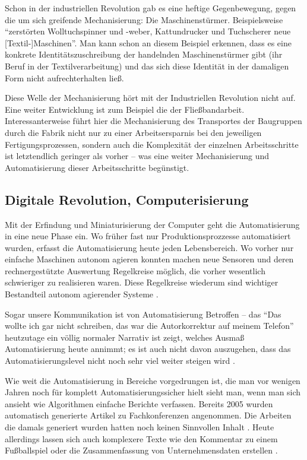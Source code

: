 Schon in der industriellen Revolution gab es eine heftige Gegenbewegung, gegen die um sich greifende Mechanisierung: Die Maschinenstürmer.
Beispielsweise \enquote{zerstörten Wolltuchspinner und -weber, Kattundrucker und Tuchscherer neue [Textil-]Maschinen}\parencite[44]{spehr}.
Man kann schon an diesem Beispiel erkennen, dass es eine konkrete Identitätszuschreibung der handelnden Maschinenstürmer gibt (ihr Beruf in der Textilverarbeitung) und das sich diese Identität in der damaligen Form nicht aufrechterhalten ließ.


Diese Welle der Mechanisierung hört mit der Industriellen Revolution nicht auf.
Eine weiter Entwicklung ist zum Beispiel die der Fließbandarbeit.
Interessanterweise führt hier die Mechanisierung des Transportes der Baugruppen durch die Fabrik nicht nur zu einer Arbeitsersparnis bei den jeweiligen Fertigungsprozessen, sondern auch die Komplexität der einzelnen Arbeitsschritte ist letztendlich geringer als vorher – was eine weiter Mechanisierung und Automatisierung dieser Arbeitsschritte begünstigt.

\subsection {Digitale Revolution, Computerisierung}
Mit der Erfindung und Miniaturisierung der Computer geht die Automatisierung in eine neue Phase ein. Wo früher fast nur Produktionsprozzesse automatisiert wurden, erfasst die Automatisierung heute jeden Lebensbereich.
Wo vorher nur einfache Maschinen autonom agieren konnten machen neue Sensoren und deren rechnergestützte Auswertung Regelkreise möglich, die vorher wesentlich schwieriger zu realisieren waren.
Diese Regelkreise wiederum sind wichtiger Bestandteil autonom agierender Systeme \parencite{ulrich}.


Sogar unsere Kommunikation ist von Automatisierung Betroffen – das \enquote{Das wollte ich gar nicht schreiben, das war die Autorkorrektur auf meinem Telefon} heutzutage ein völlig normaler Narrativ ist zeigt, welches Ausmaß Automatisierung heute annimmt; es ist auch nicht davon auszugehen, dass das Automatisierungslevel nicht noch sehr viel weiter steigen wird \parencite{arbeitsfrei}.

Wie weit die Automatisierung in Bereiche vorgedrungen ist, die man vor wenigen Jahren noch für komplett Automatisierungssicher hielt sieht man, wenn man sich ansieht wie Algorithmen einfache Berichte verfassen. Bereits 2005 wurden automatisch generierte Artikel zu Fachkonferenzen angenommen. Die Arbeiten die damals generiert wurden hatten noch keinen Sinnvollen Inhalt \parencite{scigen}.
Heute allerdings lassen sich auch komplexere Texte wie den Kommentar zu einem Fußballspiel oder die Zusammenfassung von Unternehmensdaten erstellen \parencite{bou}.

